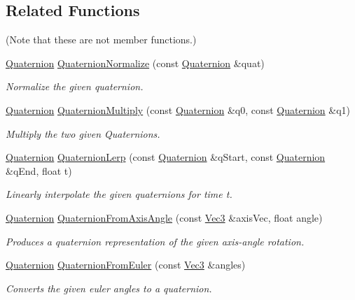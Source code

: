 \subsection*{Related Functions}
(Note that these are not member functions.) {\bf }\par
\begin{DoxyCompactItemize}
\item 
\hyperlink{classgfxmath_1_1_quaternion}{Quaternion} \hyperlink{classgfxmath_1_1_quaternion_a0b4dfb2804fb5c44a112dc6b8ea43278}{Quaternion\+Normalize} (const \hyperlink{classgfxmath_1_1_quaternion}{Quaternion} \&quat)
\begin{DoxyCompactList}\small\item\em Normalize the given quaternion. \end{DoxyCompactList}\item 
\hyperlink{classgfxmath_1_1_quaternion}{Quaternion} \hyperlink{classgfxmath_1_1_quaternion_a01d5534572884ea932229ccb1aa17ac1}{Quaternion\+Multiply} (const \hyperlink{classgfxmath_1_1_quaternion}{Quaternion} \&q0, const \hyperlink{classgfxmath_1_1_quaternion}{Quaternion} \&q1)
\begin{DoxyCompactList}\small\item\em Multiply the two given Quaternions. \end{DoxyCompactList}\item 
\hyperlink{classgfxmath_1_1_quaternion}{Quaternion} \hyperlink{classgfxmath_1_1_quaternion_a7d4ad4615b2edcd99e9dcf6f0afe74ca}{Quaternion\+Lerp} (const \hyperlink{classgfxmath_1_1_quaternion}{Quaternion} \&q\+Start, const \hyperlink{classgfxmath_1_1_quaternion}{Quaternion} \&q\+End, float t)
\begin{DoxyCompactList}\small\item\em Linearly interpolate the given quaternions for time t. \end{DoxyCompactList}\item 
\hyperlink{classgfxmath_1_1_quaternion}{Quaternion} \hyperlink{classgfxmath_1_1_quaternion_abbc754cd1e171bd2d945376bb8a39a8f}{Quaternion\+From\+Axis\+Angle} (const \hyperlink{classgfxmath_1_1_vec3}{Vec3} \&axis\+Vec, float angle)
\begin{DoxyCompactList}\small\item\em Produces a quaternion representation of the given axis-\/angle rotation. \end{DoxyCompactList}\item 
\hyperlink{classgfxmath_1_1_quaternion}{Quaternion} \hyperlink{classgfxmath_1_1_quaternion_a6ea767e2a30159fd9c671ce16e949e38}{Quaternion\+From\+Euler} (const \hyperlink{classgfxmath_1_1_vec3}{Vec3} \&angles)
\begin{DoxyCompactList}\small\item\em Converts the given euler angles to a quaternion. \end{DoxyCompactList}\end{DoxyCompactItemize}

